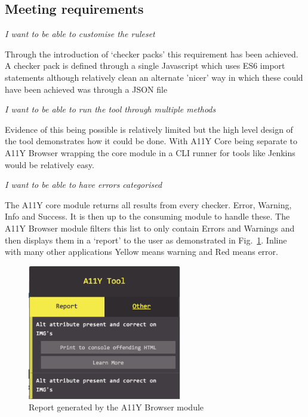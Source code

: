 \subsection{Meeting requirements}
\begin{center}
\textit{I want to be able to customise the ruleset}
\end{center}
Through the introduction of `checker packs' this requirement has been
achieved. A checker pack is defined through a single Javascript which uses
ES6 import statements although relatively clean an alternate 'nicer' way in
which these could have been achieved was through a JSON file

\begin{center}
\textit{I want to be able to run the tool through multiple methods}
\end{center}
Evidence of this being possible is relatively limited but the high level
design of the tool demonstrates how it could be done. With A11Y Core being
separate to A11Y Browser wrapping the core module in a CLI runner for tools
like Jenkins would be relatively easy.

\begin{center}
\textit{I want to be able to have errors categorised}
\end{center}
The A11Y core module returns all results from every checker. Error, Warning,
Info and Success. It is then up to the consuming module to handle these. The
A11Y Browser module filters this list to only contain Errors and Warnings and
then displays them in a `report' to the user as demonstrated in
Fig.~\ref{fig:a11y_tool_report}. Inline with many other applications Yellow
means warning and Red means error.

\begin{figure}[H]
\centering
\includegraphics[width=0.6\textwidth]{figures/a11y_tool_report}
\captionsetup{justification=centering}
\caption{Report generated by the A11Y Browser module
\label{fig:a11y_tool_report}}
\end{figure}

